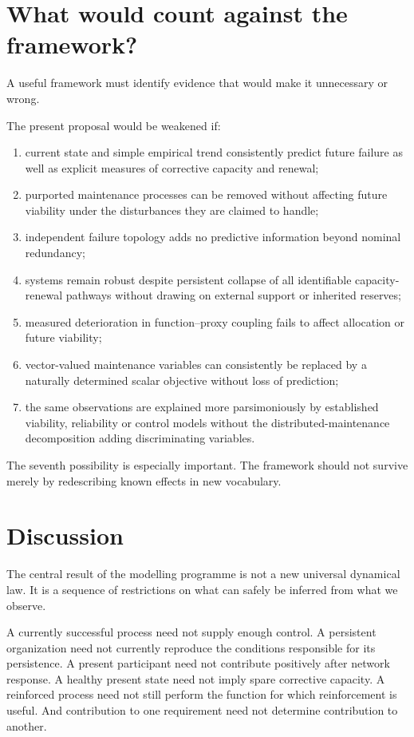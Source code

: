 \section{What would count against the framework?}

A useful framework must identify evidence that would make it unnecessary or wrong.

The present proposal would be weakened if:
\begin{enumerate}[label=(\arabic*)]
\item current state and simple empirical trend consistently predict future failure as well as explicit measures of corrective capacity and renewal;
\item purported maintenance processes can be removed without affecting future viability under the disturbances they are claimed to handle;
\item independent failure topology adds no predictive information beyond nominal redundancy;
\item systems remain robust despite persistent collapse of all identifiable capacity-renewal pathways without drawing on external support or inherited reserves;
\item measured deterioration in function--proxy coupling fails to affect allocation or future viability;
\item vector-valued maintenance variables can consistently be replaced by a naturally determined scalar objective without loss of prediction;
\item the same observations are explained more parsimoniously by established viability, reliability or control models without the distributed-maintenance decomposition adding discriminating variables.
\end{enumerate}

The seventh possibility is especially important. The framework should not survive merely by redescribing known effects in new vocabulary.

\section{Discussion}

The central result of the modelling programme is not a new universal dynamical law. It is a sequence of restrictions on what can safely be inferred from what we observe.

A currently successful process need not supply enough control. A persistent organization need not currently reproduce the conditions responsible for its persistence. A present participant need not contribute positively after network response. A healthy present state need not imply spare corrective capacity. A reinforced process need not still perform the function for which reinforcement is useful. And contribution to one requirement need not determine contribution to another.

